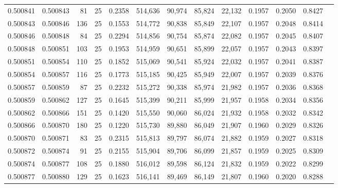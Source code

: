 \begin{tabular}{rrrrrrrrrrrrr}
0.500841 & 0.500843 &  81 &  25 &                                     0.2358 & 514,636 &  90,974 &  85,824 &  22,132 & 0.1957 & 0.2050 & 0.8427 \\
0.500843 & 0.500846 & 136 &  25 &                                     0.1553 & 514,772 &  90,838 &  85,849 &  22,107 & 0.1957 & 0.2048 & 0.8414 \\
0.500846 & 0.500848 &  84 &  25 &                                     0.2294 & 514,856 &  90,754 &  85,874 &  22,082 & 0.1957 & 0.2045 & 0.8407 \\
0.500848 & 0.500851 & 103 &  25 &                                     0.1953 & 514,959 &  90,651 &  85,899 &  22,057 & 0.1957 & 0.2043 & 0.8397 \\
0.500851 & 0.500854 & 110 &  25 &                                     0.1852 & 515,069 &  90,541 &  85,924 &  22,032 & 0.1957 & 0.2041 & 0.8387 \\
0.500854 & 0.500857 & 116 &  25 &                                     0.1773 & 515,185 &  90,425 &  85,949 &  22,007 & 0.1957 & 0.2039 & 0.8376 \\
0.500857 & 0.500859 &  87 &  25 &                                     0.2232 & 515,272 &  90,338 &  85,974 &  21,982 & 0.1957 & 0.2036 & 0.8368 \\
0.500859 & 0.500862 & 127 &  25 &                                     0.1645 & 515,399 &  90,211 &  85,999 &  21,957 & 0.1958 & 0.2034 & 0.8356 \\
0.500862 & 0.500866 & 151 &  25 &                                     0.1420 & 515,550 &  90,060 &  86,024 &  21,932 & 0.1958 & 0.2032 & 0.8342 \\
0.500866 & 0.500870 & 180 &  25 &                                     0.1220 & 515,730 &  89,880 &  86,049 &  21,907 & 0.1960 & 0.2029 & 0.8326 \\
0.500870 & 0.500871 &  83 &  25 &                                     0.2315 & 515,813 &  89,797 &  86,074 &  21,882 & 0.1959 & 0.2027 & 0.8318 \\
0.500872 & 0.500874 &  91 &  25 &                                     0.2155 & 515,904 &  89,706 &  86,099 &  21,857 & 0.1959 & 0.2025 & 0.8309 \\
0.500874 & 0.500877 & 108 &  25 &                                     0.1880 & 516,012 &  89,598 &  86,124 &  21,832 & 0.1959 & 0.2022 & 0.8299 \\
0.500877 & 0.500880 & 129 &  25 &                                     0.1623 & 516,141 &  89,469 &  86,149 &  21,807 & 0.1960 & 0.2020 & 0.8288 \\

\end{tabular}
